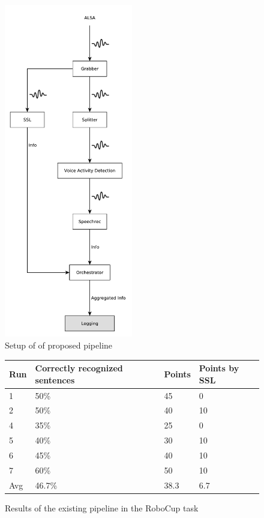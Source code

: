 \begin{figure}[]
	\centering
	\includegraphics[width=0.5\textwidth]{diagrams/eval_task_proposed.pdf}
	\caption{Setup of of proposed pipeline}
	\label{pic:eval_task_setup_new}
\end{figure}

\begin{figure}[]
	\begin{tabular}{ | l | l | l | l |}
		\hline
		Run & Correctly recognized sentences & Points & Points by SSL \\ \hline
		1 & 50\% & 45 & 0 \\ \hline
		2 & 50\% & 40 & 10 \\ \hline
		4 & 35\% & 25 &  0 \\ \hline
		5 & 40\% & 30 & 10 \\ \hline
		6 & 45\% & 40 & 10 \\ \hline
		7 & 60\% & 50 & 10 \\ \hhline{|=|=|=|=|} 
		Avg & 46.7\% & 38.3 & 6.7 \\
		\hline
	\end{tabular}
	\caption{Results of the existing pipeline in the RoboCup task}
	\label{pic:eval_task_results_old}
\end{figure}

